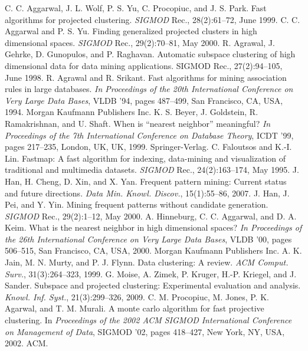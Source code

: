 \documentclass[a4paper, 11pt, oneside]{Thesis}  %
\begin{document}
\begin{thebibliography}{99}
		C. C. Aggarwal, J. L. Wolf, P. S. Yu, C. Procopiuc, and J. S. Park. Fast algorithms for projected clustering. \emph{SIGMOD} Rec., 28(2):61–72, June 1999.
		C. C. Aggarwal and P. S. Yu. Finding generalized projected clusters in high dimensional spaces. \emph{SIGMOD} Rec., 29(2):70–81, May 2000.
		R. Agrawal, J. Gehrke, D. Gunopulos, and P. Raghavan. Automatic subspace clustering of high dimensional data for data mining applications.  SIGMOD Rec., 27(2):94–105, June 1998.  
		R. Agrawal and R. Srikant. Fast algorithms for mining association rules in large databases. \emph{In Proceedings of the 20th International Conference on Very Large Data Bases}, VLDB ’94, pages 487–499, San Francisco, CA, USA, 1994. Morgan Kaufmann Publishers Inc.
		K. S. Beyer, J. Goldstein, R. Ramakrishnan, and U. Shaft. When is “nearest neighbor” meaningful? \emph{In Proceedings of the 7th International Conference on Database Theory}, ICDT ’99, pages 217–235, London, UK, UK, 1999. Springer-Verlag.
		C. Faloutsos and K.-I. Lin. Fastmap: A fast algorithm for indexing, data-mining and visualization of traditional and multimedia datasets. \emph{SIGMOD} Rec., 24(2):163–174, May 1995.
		J. Han, H. Cheng, D. Xin, and X. Yan. Frequent
		pattern mining: Current status and future directions.
		\emph{Data Min. Knowl. Discov.}, 15(1):55–86, 2007.
		J. Han, J. Pei, and Y. Yin. Mining frequent patterns
		without candidate generation. \emph{SIGMOD} Rec.,
		29(2):1–12, May 2000.
		A. Hinneburg, C. C. Aggarwal, and D. A. Keim. What
		is the nearest neighbor in high dimensional spaces? \emph{In
			Proceedings of the 26th International Conference on
		Very Large Data Bases}, VLDB ’00, pages 506–515,
		San Francisco, CA, USA, 2000. Morgan Kaufmann
		Publishers Inc.
		A. K. Jain, M. N. Murty, and P. J. Flynn. Data
		clustering: A review. \emph{ACM Comput. Surv.},
		31(3):264–323, 1999.
		G. Moise, A. Zimek, P. Kruger, H.-P. Kriegel,
		and J. Sander. Subspace and projected clustering:
		Experimental evaluation and analysis. \emph{Knowl. Inf.
		Syst.}, 21(3):299–326, 2009.
		C. M. Procopiuc, M. Jones, P. K. Agarwal, and T. M.
		Murali. A monte carlo algorithm for fast projective
		clustering. In \emph{Proceedings of the 2002 ACM SIGMOD
		International Conference on Management of Data},
		SIGMOD ’02, pages 418–427, New York, NY, USA,
		2002. ACM.

\end{thebibliography}
\end{document}
